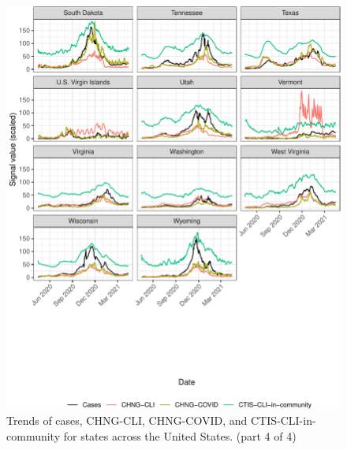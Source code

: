 \begin{figure}

{\centering \includegraphics[width=\textwidth]{fig/state-trend-grids-4-1}

}

\caption{Trends of cases, CHNG-CLI, CHNG-COVID, and CTIS-CLI-in-community for states across the United States. (part 4 of 4)}\label{fig:state-trend-grids-4}
\end{figure}

\clearpage

